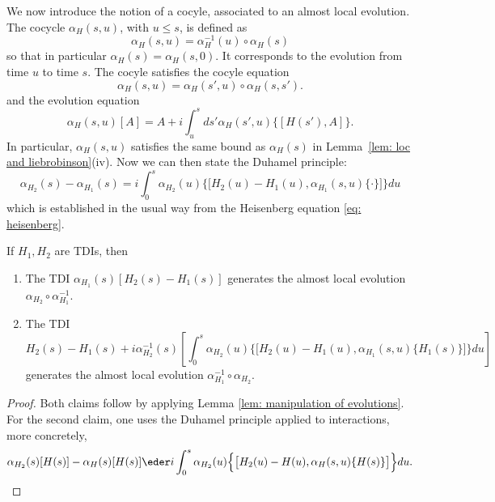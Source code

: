 We now introduce the notion of a cocyle, associated to an almost local evolution.  
The cocycle $\alpha_H(s,u)$, with $u\leq s$, is defined as
\begin{equation}\label{cocylce bis}
\alpha_H(s,u) = \alpha_H^{-1}(u)\circ\alpha_H(s)
\end{equation}
so that in particular $\alpha_H(s)=\alpha_H(s,0)$. It corresponds to the evolution from time $u$ to time $s$. The cocyle satisfies the cocyle  equation
%
\begin{equation}\label{cocylce equation}
\alpha_H(s,u)=    \alpha_H(s',u) \circ \alpha_H(s,s').
\end{equation}
and the evolution equation
$$
\alpha_H(s,u)[A] = A+i \int_u^s ds' \alpha_H(s',u)\{[H(s'),A]\}.
$$ 
%
%
In particular, $\alpha_H(s,u)$ satisfies the same bound as $\alpha_H(s)$ in Lemma~\ref{lem: loc and liebrobinson}(iv). Now we can then state the Duhamel principle:
%
\begin{equation}\label{Duhamel}
\alpha_{H_2}(s)- \alpha_{H_1}(s)=  i\int_0^s \alpha_{H_2}(u)\big\{\big[H_2(u) - {H_1}(u),\alpha_{H_1}(s,u)\{\cdot\}\big]\big\}du
\end{equation}
%
which is established in the usual way from the Heisenberg equation \eqref{eq: heisenberg}. 
\begin{lemma}\label{lem: inverse small diff}
	If ${H_1},{H_2}$ are TDIs, then 
	\begin{enumerate}
		\item The TDI  $\alpha_{{H_1}}(s)[{H_2}(s)-{H_1}(s)]$ generates the almost local evolution $ \alpha_{{H_2}}\circ\alpha_{{H_1}}^{-1}$.
		\item The TDI 
		\begin{equation}
		\label{Difference}
		{H_2}(s)-{H_1}(s)+ i \alpha_{H_2}^{-1}(s)\left[\int_0^s \alpha_{{H_2}}(u)\Big\{\big[{H_2}(u) - H_1(u),\alpha_{H_1}(s,u)\{H_1(s)\}\big]\Big\}du \right]
		\end{equation}
		generates the almost local evolution $\alpha_{{H_1}}^{-1}\circ\alpha_{{H_2}}$. 
	\end{enumerate}
\end{lemma}
\begin{proof}
	Both claims follow by applying Lemma \ref{lem: manipulation of evolutions}. For the second claim, one uses the Duhamel principle applied to interactions, more concretely,
	\begin{equation} \label{eq: duhamel}
	\alpha_{{H_2}}(s)[H(s)] - \alpha_H(s)[H(s)] \eder i\int_0^s \alpha_{{H_2}}(u)\Big\{\big[{H_2}(u) - H(u),\alpha_{H}(s,u)\{{H}(s)\}\big]\Big\}du.
	\end{equation}
\end{proof}




